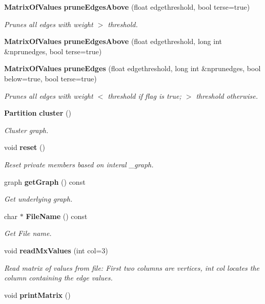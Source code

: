 \begin{CompactItemize}
\item 
{\bf Matrix\-Of\-Values} {\bf prune\-Edges\-Above} (float edgethreshold, bool terse=true)\label{classMatrixOfValues_a6}

\begin{CompactList}\small\item\em Prunes all edges with weight $>$ threshold. \item\end{CompactList}\item 
{\bf Matrix\-Of\-Values} {\bf prune\-Edges\-Above} (float edgethreshold, long int \&nprunedges, bool terse=true)\label{classMatrixOfValues_a7}

\item 
{\bf Matrix\-Of\-Values} {\bf prune\-Edges} (float edgethreshold, long int \&nprunedges, bool below=true, bool terse=true)
\begin{CompactList}\small\item\em Prunes all edges with weight $<$ threshold if flag is true; $>$ threshold otherwise. \item\end{CompactList}\item 
{\bf Partition} {\bf cluster} ()
\begin{CompactList}\small\item\em Cluster graph. \item\end{CompactList}\item 
void {\bf reset} ()\label{classMatrixOfValues_a10}

\begin{CompactList}\small\item\em Reset private members based on interal \_\-graph. \item\end{CompactList}\item 
graph {\bf get\-Graph} () const\label{classMatrixOfValues_a11}

\begin{CompactList}\small\item\em Get underlying graph. \item\end{CompactList}\item 
char $\ast$ {\bf File\-Name} () const\label{classMatrixOfValues_a12}

\begin{CompactList}\small\item\em Get File name. \item\end{CompactList}\item 
void {\bf read\-Mx\-Values} (int col=3)
\begin{CompactList}\small\item\em Read matrix of values from file: First two columns are vertices, int col locates the column containing the edge values. \item\end{CompactList}\item 
void {\bf print\-Matrix} ()\label{classMatrixOfValues_a14}


\end{CompactItemize}
